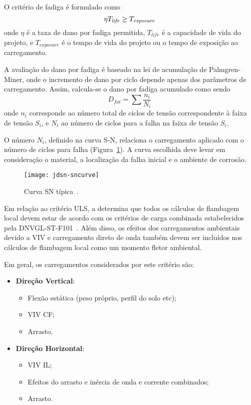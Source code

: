 O critério de fadiga é formulado como
\begin{equation}
\label{eq:jdsn-eqfat}
\eta T_\mathit{life} \geq T_\mathit{exposure}\\
\end{equation}
onde $\eta$ é a taxa de dano por fadiga permitida, $T_\mathit{life}$ é a capacidade de vida do projeto, e
$T_\mathit{exposure}$ é o tempo de vida do projeto ou o tempo de exposição ao carregamento.

A avaliação do dano por fadiga é baseado na lei de acumulação de Palmgren-Miner, onde o incremento de dano por ciclo depende apenas dos parâmetros de carregamento.
Assim, calcula-se o dano por fadiga acumulado como sendo
\begin{equation}
\label{eq:jdsn-eqpm}
D_\mathit{fat} = \sum \frac{n_i}{N_i}
\end{equation}
onde $n_i$ corresponde ao número total de ciclos de tensão correspondente à faixa de tensão $S_i$, e $N_i$ ao número de ciclos para a falha na faixa de tensão $S_i$.

O número $N_i$, definido na curva S-N, relaciona o carregamento aplicado com o número de ciclos para falha (Figura~\ref{fig:jdsn-sncurve}).
A curva escolhida deve levar em consideração o material, a localização da falha inicial e o ambiente de corrosão.
\begin{figure}[hbt!]
\begin{center}
\texttt{[image: jdsn-sncurve]}
\caption{Curva SN típica~\cite{DNV2017}.}
\label{fig:jdsn-sncurve}
\end{center}
\vspace{-0.7cm}
\end{figure}

\sloppy
Em relação ao critério ULS, a  determina que todos os cálculos de flambagem local devem estar de acordo com os critérios de carga combinada estabelecidos pela \mbox{DNVGL-ST-F101}~\cite{DNVF101}. Além disso, os efeitos dos carregamentos ambientais devido a VIV e carregamento direto de onda também devem ser incluídos nos cálculos de flambagem local como um momento fletor ambiental.

Em geral, os carregamentos considerados por este critério são:
\begin{itemize}
	\item \textbf{Direção Vertical}:
	\begin{itemize}
		\item Flexão estática (peso próprio, perfil do solo etc);
		\item VIV CF;
		\item Arrasto.
	\end{itemize}
	\item \textbf{Direção Horizontal}:
	\begin{itemize}
		\item VIV IL;
		\item Efeitos do arrasto e inércia de onda e corrente combinados;
		\item Arrasto.
	\end{itemize}
\end{itemize}


